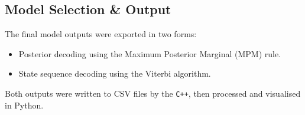 \subsection{Model Selection \& Output}

The final model outputs were exported in two forms:
\begin{itemize}
    \item Posterior decoding using the Maximum Posterior Marginal (MPM) rule.
    \item State sequence decoding using the Viterbi algorithm.
\end{itemize}
Both outputs were written to CSV files by the \texttt{C++}, then processed and visualised in Python.  
